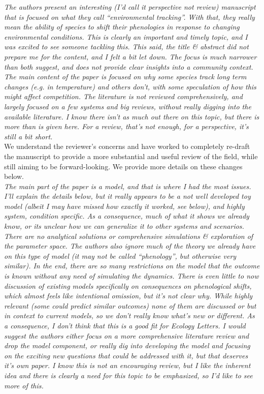\documentclass[11pt]{article}
\begin{document}
\emph{The authors present an interesting (I’d call it perspective not review) manuscript that is
focused on what they call ``environmental tracking''. With that, they really mean the ability
of species to shift their phenologies in response to changing environmental conditions. This
is clearly an important and timely topic, and I was excited to see someone tackling this.
This said, the title \& abstract did not prepare me for the content, and I felt a bit let
down. The focus is much narrower than both suggest, and does not provide clear insights into
a community context. The main content of the paper is focused on why some species track long
term changes (e.g. in temperature) and others don’t, with some speculation of how this might
affect competition. The literature is not reviewed comprehensively, and largely focused on a
few systems and big reviews, without really digging into the available literature. I know
there isn’t as much out there on this topic, but there is more than is given here. For a
review, that’s not enough, for a perspective, it’s still a bit short. }\\

We understand the reviewer's concerns and have worked to completely re-draft the manuscript to provide a more substantial and useful review of the field, while still aiming to be forward-looking. We provide more details on these changes below. \\

\emph{The main part of the
paper is a model, and that is where I had the most issues. I’ll explain the details below,
but it really appears to be a not well developed toy model (albeit I may have missed how
exactly it worked, see below), and highly system, condition specific. As a consequence, much
of what it shows we already know, or its unclear how we can generalize it to other systems
and scenarios. There are no analytical solutions or comprehensive simulations \& exploration
of the parameter space. The authors also ignore much of the theory we already have on this
type of model (it may not be called ``phenology'', but otherwise very similar). In the end,
there are so many restrictions on the model that the outcome is known without any need of
simulating the dynamics. There is even little to now discussion of existing models
specifically on consequences on phenological shifts, which almost feels like intentional
omission, but it’s not clear why. While highly relevant (some could predict similar outcomes)
none of them are discussed or but in context to current models, so we don’t really know
what’s new or different. As a consequence, I don’t think that this is a good fit for Ecology
Letters. I would suggest the authors either focus on a more comprehensive literature review
and drop the model component, or really dig into developing the model and focusing on the
exciting new questions that could be addressed with it, but that deserves it’s own paper. I
know this is not an encouraging review, but I like the inherent idea and there is clearly a
need for this topic to be emphasized, so I’d like to see more of this.}\\
\end{document}
